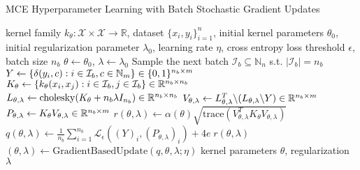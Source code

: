 \documentclass[twoside]{article}
\begin{document}
		\begin{algorithm}[tb]
			\caption{\gls{MCE} Hyperparameter Learning with Batch Stochastic Gradient Updates}
			\label{alg:multiclass_conditional_embedding_training}
			\begin{algorithmic}[1]
				 kernel family $k_{\theta} : \mathcal{X} \times \mathcal{X} \to \mathbb{R}$, dataset $\{x_{i}, y_{i}\}_{i = 1}^{n}$, initial kernel parameters $\theta_{0}$, initial regularization parameter $\lambda_{0}$, learning rate $\eta$, cross entropy loss threshold $\epsilon$, batch size $n_{b}$
				\STATE $\theta \leftarrow \theta_{0}$, $\lambda \leftarrow \lambda_{0}$
				\REPEAT
				\STATE Sample the next batch $\mathcal{I}_{b} \subseteq \mathbb{N}_{n}$ s.t. $| \mathcal{I}_{b} | = n_{b}$ %
				\STATE $Y \leftarrow \{\delta(y_{i}, c) : i \in \mathcal{I}_{b}, c \in \mathbb{N}_{m}\} \hspace{\fill} \in \{0, 1\}^{n_{b} \times m}$
				\STATE $K_{\theta} \leftarrow \{k_{\theta}(x_{i}, x_{j}) : i \in \mathcal{I}_{b}, j \in \mathcal{I}_{b}\} \hspace{\fill} \in \mathbb{R}^{n_{b} \times n_{b}}$
				\STATE $L_{\theta, \lambda} \leftarrow \mathrm{cholesky}(K_{\theta} + n_{b} \lambda I_{n_{b}}) \hspace{\fill} \in \mathbb{R}^{n_{b} \times n_{b}}$
				\STATE $V_{\theta, \lambda} \leftarrow L_{\theta, \lambda}^{T} \backslash (L_{\theta, \lambda} \backslash Y) \hspace{\fill} \in \mathbb{R}^{n_{b} \times m}$
				\STATE $P_{\theta, \lambda} \leftarrow K_{\theta} V_{\theta, \lambda} \hspace{\fill} \in \mathbb{R}^{n_{b} \times m}$
				\STATE$r(\theta, \lambda) \leftarrow \alpha(\theta) \sqrt{\mathrm{trace}(V_{\theta, \lambda}^{T} K_{\theta} V_{\theta, \lambda})}$
				\STATE $q(\theta, \lambda) \leftarrow \frac{1}{n_{b}} \sum_{i = 1}^{n_{b}} \mathcal{L}_{\epsilon}((Y)_{i}, (P_{\theta, \lambda})_{i}) + 4 e \; r(\theta, \lambda)$
				\STATE $(\theta, \lambda) \leftarrow \mathrm{GradientBasedUpdate}(q, \theta, \lambda; \eta)$ %
				 kernel parameters $\theta$, regularization $\lambda$
			\end{algorithmic}
		\end{algorithm}
		
\end{document}
